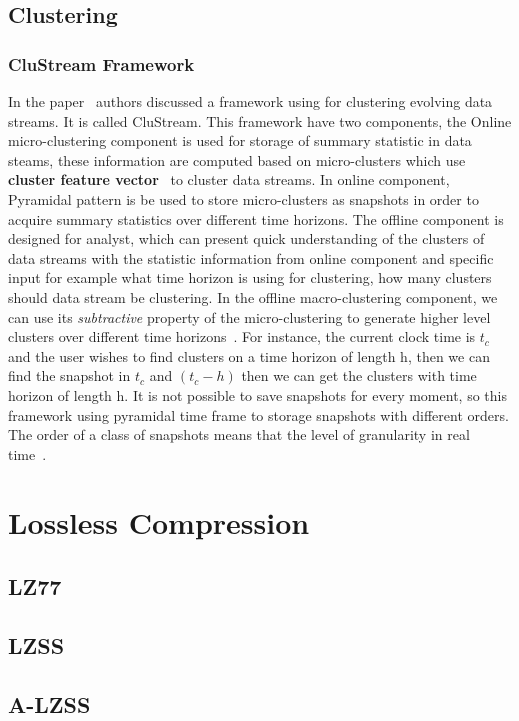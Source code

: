 \subsection{Clustering}
\subsubsection{CluStream Framework}
In the paper~\cite{aggarwal2003framework} authors discussed a framework using
for clustering evolving data streams. It is called CluStream. This framework
have two components, the Online micro-clustering component is used for storage
of summary statistic in data steams, these information are computed based on
micro-clusters which use \textbf{cluster feature vector}~\cite{zhang1996birch}
to cluster data streams. In online component, Pyramidal pattern is be used to
store micro-clusters as snapshots in order to acquire summary statistics over
different time horizons. The offline component is designed for analyst, which
can present quick understanding of the clusters of data streams with the
statistic information from online component and specific input for example what
time horizon is using for clustering, how many clusters should data stream be
clustering. In the offline macro-clustering component, we can use its
\emph{subtractive} property of the micro-clustering to generate higher level
clusters over different time horizons~\cite{aggarwal2003framework}. For
instance, the current clock time is $t_c$ and the user wishes to find clusters
on a time horizon of length h, then we can find the snapshot in $t_c$ and $(t_c-
h)$ then we can get the clusters with time horizon of length h. It is not
possible to save snapshots for every moment, so this framework using pyramidal
time frame to storage snapshots with different orders. The order of a class of
snapshots means that the level of granularity in real
time~\cite{aggarwal2003framework}.


\section{Lossless Compression}
\subsection{LZ77}
\subsection{LZSS}
\subsection{A-LZSS}

